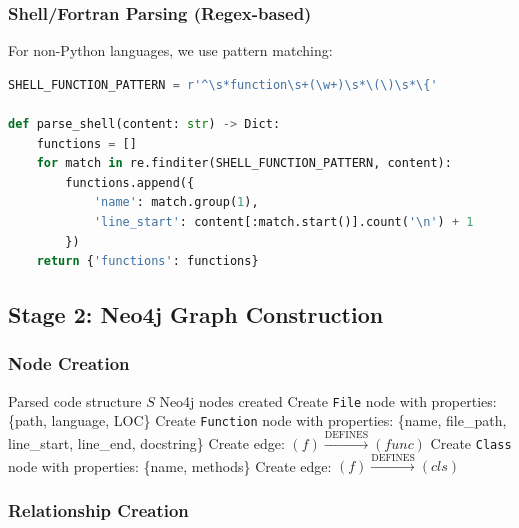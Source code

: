 \documentclass[11pt,letterpaper]{article}
\begin{document}
\subsubsection{Shell/Fortran Parsing (Regex-based)}

For non-Python languages, we use pattern matching:

\begin{lstlisting}[language=Python, caption=Shell function extraction]
SHELL_FUNCTION_PATTERN = r'^\s*function\s+(\w+)\s*\(\)\s*\{'

def parse_shell(content: str) -> Dict:
    functions = []
    for match in re.finditer(SHELL_FUNCTION_PATTERN, content):
        functions.append({
            'name': match.group(1),
            'line_start': content[:match.start()].count('\n') + 1
        })
    return {'functions': functions}
\end{lstlisting}

\subsection{Stage 2: Neo4j Graph Construction}

\subsubsection{Node Creation}

\begin{algorithm}
\caption{Create Graph Nodes}
\begin{algorithmic}[1]
\REQUIRE Parsed code structure $S$
\ENSURE Neo4j nodes created
    \STATE Create \texttt{File} node with properties: \{path, language, LOC\}
        \STATE Create \texttt{Function} node with properties: \{name, file\_path, line\_start, line\_end, docstring\}
        \STATE Create edge: $(f) \xrightarrow{\text{DEFINES}} (func)$
    \ENDFOR
        \STATE Create \texttt{Class} node with properties: \{name, methods\}
        \STATE Create edge: $(f) \xrightarrow{\text{DEFINES}} (cls)$
    \ENDFOR
\ENDFOR
\end{algorithmic}
\end{algorithm}

\subsubsection{Relationship Creation}
\end{document}
